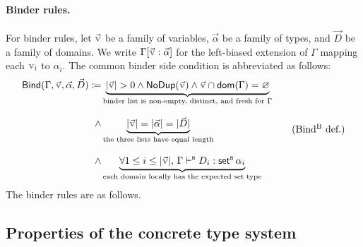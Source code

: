 \begin{definition}
\paragraph{Binder rules.}
For binder rules, let \(\vec{\var{v}}\) be a family of variables, \(\vec\alpha\) be a family of types,
and \(\vec D\) be a family of domains.
We write \(\Gamma[\vec{\var{v}} : \vec\alpha]\) for the left-biased extension of
\(\Gamma\) mapping each \(\var{v_i}\) to \(\alpha_i\).
The common binder side condition is abbreviated as follows:
\begin{equation}
\begin{aligned}
  \mathsf{Bind}(\Gamma,\vec{\var{v}},\vec\alpha,\vec D) \coloneq
    &\underbrace{|\vec{\var{v}}| > 0 \land \mathsf{NoDup}(\vec{\var{v}})
       \land \vec{\var{v}} \cap \mathsf{dom}(\Gamma)=\varnothing}
      _{\text{binder list is non-empty, distinct, and fresh for }\Gamma} \\[1.8ex]
  \land{} &\underbrace{|\vec{\var{v}}| = |\vec\alpha| = |\vec D|}
      _{\text{the three lists have equal length}} \\[1.8ex]
  \land{} &\underbrace{\forall 1 \leq i \leq |\vec{\var{v}}|,\, \btype{\Gamma}{D_i}{\setB\alpha_i}}
      _{\text{each domain locally has the expected set type}}
\end{aligned}
\tag{Bind\textsuperscript{B} def.}
\label{eq:def-bind}
\end{equation}
The binder rules are as follows.
\end{definition}

\subsection{Properties of the concrete type system}

